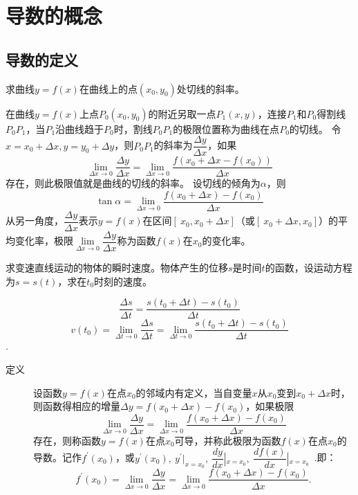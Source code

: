 \section{导数的概念}
\subsection{导数的定义}
\begin{example}
求曲线$y=f(x)$在曲线上的点$ \left( x_0,y_0 \right)$处切线的斜率。
\end{example}
\begin{center}
\end{center}
在曲线$y=f(x)$上点$P_0(x_0,y_0)$的附近另取一点$P_1(x,y)$，连接$P_1$和$P_0$得割线$P_0P_1$，当$P_1$沿曲线趋于$P_0$时，割线$P_0P_1$的极限位置称为曲线在点$P_0$的切线。
令$x=x_0+\Delta x,y=y_0+\Delta y$，则$P_0P_1$的斜率为$\dfrac{\Delta y}{\Delta x}$，如果$$ \lim_{\Delta x\rightarrow 0} \dfrac{\Delta y}{\Delta x}=\lim_{\Delta x\rightarrow 0} \dfrac{f(x_0+\Delta x-f(x_0))}{\Delta x}$$
存在，则此极限值就是曲线的切线的斜率。
设切线的倾角为$\alpha$，则$$\tan \alpha=\lim_{\Delta x\rightarrow 0} \dfrac{f(x_0+\Delta x)-f(x_0)}{\Delta x}$$ 
从另一角度，$\dfrac{\Delta y}{\Delta x}$表示$y=f(x)$在区间$\left[~x_0,x_0+\Delta x\right]$（或$\left[~x_0+\Delta x,x_0\right]$）的平均变化率，极限$\lim\limits_{\Delta x\rightarrow 0} \dfrac{\Delta y}{\Delta x}$称为函数$f(x)$在$x_0$的变化率。
\begin{example}
求变速直线运动的物体的瞬时速度。物体产生的位移$s$是时间$t$的函数，设运动方程为$s=s(t)$，求在$t_0$时刻的速度。
\end{example}
\begin{solution}
\[\dfrac{\Delta s}{\Delta t}=\dfrac{s(t_0+\Delta t)-s(t_0)}{\Delta t} \]
\[ v(t_0)=\lim_{\Delta t\rightarrow 0} \dfrac{\Delta s}{\Delta t}=\lim_{\Delta t\rightarrow 0} \dfrac{s(t_0+\Delta t)-s(t_0)}{\Delta t} \].
\end{solution}
\begin{description}
\item[{\kaishu {}\hspace{2em}\color{cyan}定义}]\hspace{1.5em}设函数$y=f(x)$在点$x_0$的邻域内有定义，当自变量$x$从$x_0$变到$x_0+\Delta x$时，则函数得相应的增量$\Delta y=f(x_0+\Delta x)-f(x_0)$，如果极限$$\lim_{\Delta x\rightarrow 0} \dfrac{\Delta y}{\Delta x}=\lim_{\Delta x\rightarrow 0} \dfrac{f(x_0+\Delta x)-f(x_0)}{\Delta x}$$存在，则称函数$y=f(x)$在点$x_0$可导，并称此极限为函数$f(x)$在点$x_0$的导数。记作$f^\prime (x_0)$，或$y^\prime (x_0),\ y^\prime|_{x=x_0},\ \dfrac{dy}{dx}\left|_{x=x_0}\right.,\ \dfrac{df(x)}{dx}\left|_{x=x_0}\right.$~.即：$$f^\prime (x_0)=\lim_{\Delta x\rightarrow 0} \dfrac{\Delta y}{\Delta x}=\lim_{\Delta x\rightarrow 0} \dfrac{f(x_0+\Delta x)-f(x_0)}{\Delta x}.$$
\end{description}
